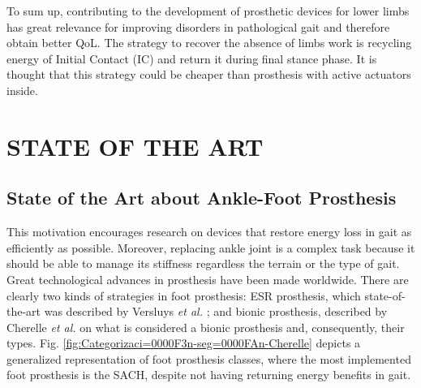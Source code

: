 \documentclass[12pt,english]{article}
\begin{document}
To sum up, contributing to the development of prosthetic devices for lower limbs has great relevance for improving disorders in pathological gait and therefore obtain better QoL. The strategy to recover the absence of limbs work is recycling energy of Initial Contact (IC) and return it during final stance phase. It is thought that this strategy could be cheaper than prosthesis with active actuators inside. 




\section{\label{sub:Estado-del-conocimiento:}STATE OF THE ART}


\subsection{State of the Art about Ankle-Foot Prosthesis}

This motivation encourages research on devices that restore energy loss in gait as efficiently as possible. Moreover, replacing ankle joint is a complex task because it should be able to manage its stiffness regardless the terrain or the type of gait. Great technological advances in prosthesis have been made worldwide. There are clearly two kinds of strategies in foot prosthesis: ESR prosthesis, which state-of-the-art was described by Versluys \emph{et al.} \cite{Versluys2009}; and bionic prosthesis, described by Cherelle \emph{et al.} \cite{Cherelle2014a} on what is considered a bionic prosthesis and, consequently, their types. Fig. \ref{fig:Categorizaci=0000F3n-seg=0000FAn-Cherelle} depicts a generalized representation of foot prosthesis classes, where the most implemented foot prosthesis  is the SACH, despite not having returning energy benefits in gait.
\end{document}
